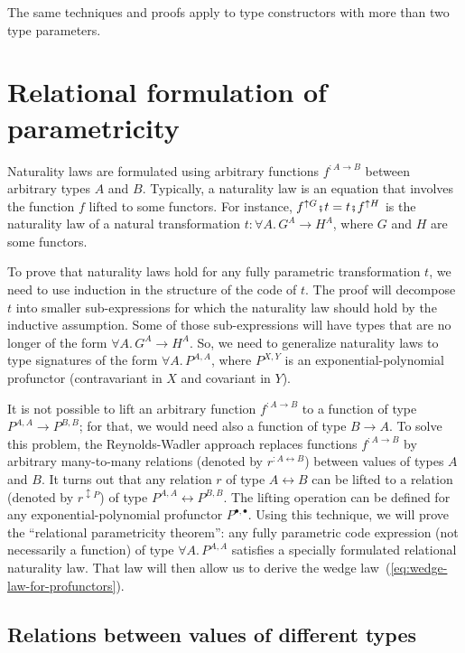 The same techniques and proofs apply to type constructors with more
than two type parameters.

\section{Relational formulation of parametricity\label{sec:Parametricity-theorem-for-relations}\label{subsec:Relations-between-types}}

Naturality laws are formulated using arbitrary functions $f^{:A\rightarrow B}$
between arbitrary types $A$ and $B$. Typically, a naturality law
is an equation that involves the function $f$ lifted to some functors.
For instance, $f^{\uparrow G}\bef t=t\bef f^{\uparrow H}$ is the
naturality law of a natural transformation $t:\forall A.\,G^{A}\rightarrow H^{A}$,
where $G$ and $H$ are some functors.

To prove that naturality laws hold for any fully parametric transformation
$t$, we need to use induction in the structure of the code of $t$.
The proof will decompose $t$ into smaller sub-expressions for which
the naturality law should hold by the inductive assumption. Some of
those sub-expressions will have types that are no longer of the form
$\forall A.\,G^{A}\rightarrow H^{A}$. So, we need to generalize naturality
laws to type signatures of the form $\forall A.\,P^{A,A}$, where
$P^{X,Y}$ is an exponential-polynomial profunctor (contravariant
in $X$ and covariant in $Y$). 

It is not possible to lift an arbitrary function $f^{:A\rightarrow B}$
to a function of type $P^{A,A}\rightarrow P^{B,B}$; for that, we
would need also a function of type $B\rightarrow A$. To solve this
problem, the Reynolds-Wadler approach replaces functions $f^{:A\rightarrow B}$
by arbitrary many-to-many relations (denoted by $r^{:A\leftrightarrow B}$)
between values of types $A$ and $B$. It turns out that any relation
$r$ of type $A\leftrightarrow B$ can be lifted to a relation (denoted
by $r^{\updownarrow P}$) of type $P^{A,A}\leftrightarrow P^{B,B}$.
The lifting operation can be defined for any exponential-polynomial
profunctor $P^{\bullet,\bullet}$. Using this technique, we will prove
the \textsf{``}relational parametricity theorem\textsf{''}: any fully parametric code
expression (not necessarily a function) of type $\forall A.\,P^{A,A}$
satisfies a specially formulated relational naturality law. That law
will then allow us to derive the wedge law~(\ref{eq:wedge-law-for-profunctors}).

\subsection{Relations between values of different types}


